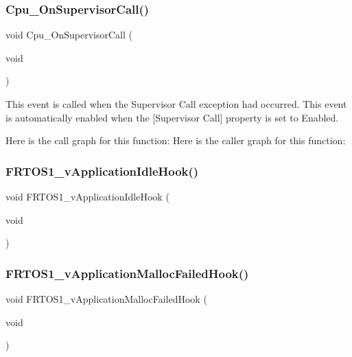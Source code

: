 \subsubsection{\texorpdfstring{Cpu\+\_\+\+On\+Supervisor\+Call()}{Cpu\_OnSupervisorCall()}}
{\footnotesize\ttfamily void Cpu\+\_\+\+On\+Supervisor\+Call (\begin{DoxyParamCaption}\item[{void}]{ }\end{DoxyParamCaption})}



This event is called when the Supervisor Call exception had occurred. This event is automatically enabled when the \mbox{[}Supervisor Call\mbox{]} property is set to \textquotesingle{}Enabled\textquotesingle{}. 

Here is the call graph for this function\+:
Here is the caller graph for this function\+:
\mbox{\label{group___events__module_ga47ee4f5ef904e733b7690af3ef89a1b0}} 
\subsubsection{\texorpdfstring{F\+R\+T\+O\+S1\+\_\+v\+Application\+Idle\+Hook()}{FRTOS1\_vApplicationIdleHook()}}
{\footnotesize\ttfamily void F\+R\+T\+O\+S1\+\_\+v\+Application\+Idle\+Hook (\begin{DoxyParamCaption}\item[{void}]{ }\end{DoxyParamCaption})}

\mbox{\label{group___events__module_ga83b87d2e8c6b269bbdc03cf06d1164a2}} 
\subsubsection{\texorpdfstring{F\+R\+T\+O\+S1\+\_\+v\+Application\+Malloc\+Failed\+Hook()}{FRTOS1\_vApplicationMallocFailedHook()}}
{\footnotesize\ttfamily void F\+R\+T\+O\+S1\+\_\+v\+Application\+Malloc\+Failed\+Hook (\begin{DoxyParamCaption}\item[{void}]{ }\end{DoxyParamCaption})}

